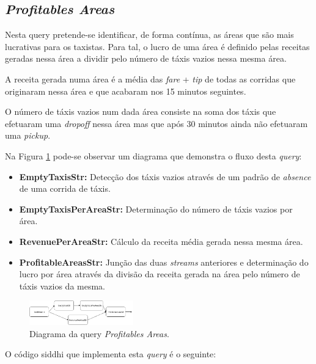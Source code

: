 \documentclass[article]{IEEEtran}
\begin{document}
\subsection{\textit{Profitables Areas}}

Nesta query pretende-se identificar, de forma contínua, as áreas que são mais lucrativas para os taxistas. Para tal, o lucro de uma área é definido pelas receitas geradas nessa área a dividir pelo número de táxis vazios nessa mesma área.

A receita gerada numa área é a média das \textit{fare} + \textit{tip} de todas as corridas que originaram nessa área e que acabaram nos 15 minutos seguintes.

O número de táxis vazios num dada área consiste na soma dos táxis que efetuaram uma \textit{dropoff} nessa área mas que após 30 minutos ainda não efetuaram uma \textit{pickup}.

Na Figura \ref{fig:profitablesAreasDiagram} pode-se observar um diagrama que demonstra o fluxo desta \textit{query}:
\begin{itemize}
\item \textbf{EmptyTaxisStr:} Detecção dos táxis vazios através de um padrão de \textit{absence} de uma corrida de táxis.
\item \textbf{EmptyTaxisPerAreaStr:} Determinação do número de táxis vazios por área.
\item \textbf{RevenuePerAreaStr:} Cálculo da receita média gerada nessa mesma área.
\item \textbf{ProfitableAreasStr:} Junção das duas \textit{streams} anteriores e determinação do lucro por área através da divisão da receita gerada na área pelo número de táxis vazios da mesma.
\end{itemize}

\begin{figure}[hbtp]
    \centering
        \includegraphics[width=0.4\textwidth]{images/profitableAreas}
    \caption{Diagrama da query \textit{Profitables Areas}.}
    \label{fig:profitablesAreasDiagram}
\end{figure}

O código siddhi que implementa esta \textit{query} é o seguinte:
\end{document}
